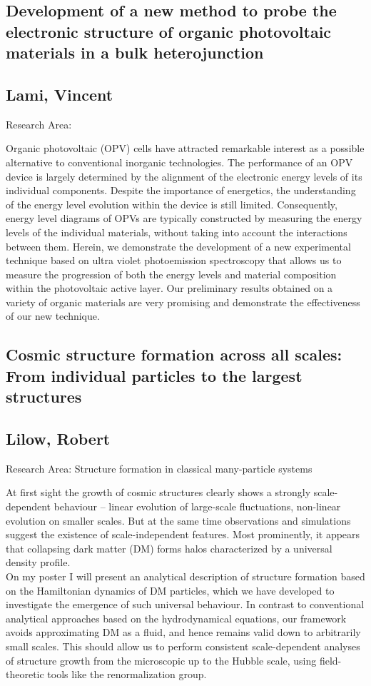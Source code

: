 \subsection*{\centering \large Development of a new method to probe the electronic structure of organic photovoltaic materials in a bulk heterojunction}
\subsection*{\centering \normalsize Lami, Vincent}
Research Area: \newline

\noindent Organic photovoltaic (OPV) cells have attracted remarkable interest as a possible alternative to conventional inorganic technologies. The performance of an OPV device is largely determined by the alignment of the electronic energy levels of its individual components. Despite the importance of energetics, the understanding of the energy level evolution within the device is still limited. Consequently, energy level diagrams of OPVs are typically constructed by measuring the energy levels of the individual materials, without taking into account the interactions between them. Herein, we demonstrate the development of a new experimental technique based on ultra violet photoemission spectroscopy that allows us to measure the progression of both the energy levels and material composition within the photovoltaic active layer. Our preliminary results obtained on a variety of organic materials are very promising and demonstrate the effectiveness of our new technique.

\subsection*{\centering \large Cosmic structure formation across all scales: From individual particles to the largest structures}
\subsection*{\centering \normalsize Lilow, Robert}
Research Area: Structure formation in classical many-particle systems\newline

\noindent At first sight the growth of cosmic structures clearly shows a strongly scale-dependent behaviour -- linear evolution of large-scale fluctuations, non-linear evolution on smaller scales. But at the same time observations and simulations suggest the existence of scale-independent features. Most prominently, it appears that collapsing dark matter (DM) forms halos characterized by a universal density profile.\\On my poster I will present an analytical description of structure formation based on the Hamiltonian dynamics of DM particles, which we have developed to investigate the emergence of such universal behaviour. In contrast to conventional analytical approaches based on the hydrodynamical equations, our framework avoids approximating DM as a fluid, and hence remains valid down to arbitrarily small scales. This should allow us to perform consistent scale-dependent analyses of structure growth from the microscopic up to the Hubble scale, using field-theoretic tools like the renormalization group.
\newpage
